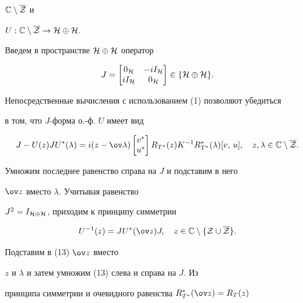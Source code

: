${\Bbb C}\setminus \overline {\cal Z}$ и


$U:{\Bbb C}\setminus \overline {\cal Z}\to {\cal H}\oplus {\cal H}$.





Введем в пространстве ${\cal H}\oplus {\cal H}$ оператор 


$$


J= \begin{bmatrix}


0_{\cal H} & -iI_{\cal H} \\


iI_{\cal H} & 0_{\cal H}


\end{bmatrix}


\in \{{\cal H}\oplus {\cal H}\}.


$$


Непосредственные вычисления с использованием (1) позволяют убедиться


в том, что $J$-форма о.-ф. $U$ имеет вид


\begin{equation}


J-U(z)JU^*(\lambda)=i(z-\ov \lambda)


\begin{bmatrix} v^* \\ u^* \end{bmatrix}R_{T^*}(z)


K^{-1}R_{T^*}^*(\lambda)[v,\, u],\quad


z,\lambda \in {\Bbb C}\setminus \overline {\cal Z}.


\end{equation}


Умножим последнее равенство справа на $J$ и подставим в него


$\ov z$ вместо $\lambda $. Учитывая равенство


$J^2=I_{{\cal H}\oplus {\cal H}}$, приходим к принципу симметрии


$$


U^{-1}(z)=JU^*(\ov z)J,\quad


z\in {\Bbb C}\setminus \{ {\cal Z} \cup \overline {\cal Z} \}.


$$


Подставим в (13) $\ov z$ вместо


$z$ и $\lambda $ и затем умножим (13) слева и справа на $J$. Из


принципа симметрии и очевидного равенства $R_{T^*}^*(\ov z)=R_{T}(z)$


